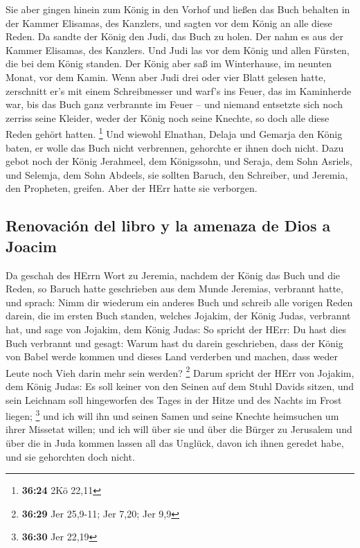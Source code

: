  Sie aber gingen hinein zum König in den Vorhof und
ließen das Buch behalten in der Kammer Elisamas, des Kanzlers, und
sagten vor dem König an alle diese Reden.  Da sandte der
König den Judi, das Buch zu holen. Der nahm es aus der Kammer Elisamas,
des Kanzlers. Und Judi las vor dem König und allen Fürsten, die bei dem
König standen.  Der König aber saß im Winterhause, im
neunten Monat, vor dem Kamin.  Wenn aber Judi drei oder
vier Blatt gelesen hatte, zerschnitt er's mit einem Schreibmesser und
warf's ins Feuer, das im Kaminherde war, bis das Buch ganz verbrannte im
Feuer --  und niemand entsetzte sich noch zerriss seine
Kleider, weder der König noch seine Knechte, so doch alle diese Reden
gehört hatten. \footnote{\textbf{36:24} 2Kö 22,11}  Und
wiewohl Elnathan, Delaja und Gemarja den König baten, er wolle das Buch
nicht verbrennen, gehorchte er ihnen doch nicht.  Dazu
gebot noch der König Jerahmeel, dem Königssohn, und Seraja, dem Sohn
Asriels, und Selemja, dem Sohn Abdeels, sie sollten Baruch, den
Schreiber, und Jeremia, den Propheten, greifen. Aber der HErr hatte sie
verborgen.

\hypertarget{renovaciuxf3n-del-libro-y-la-amenaza-de-dios-a-joacim}{%
\subsection{Renovación del libro y la amenaza de Dios a
Joacim}\label{renovaciuxf3n-del-libro-y-la-amenaza-de-dios-a-joacim}}

 Da geschah des HErrn Wort zu Jeremia, nachdem der König
das Buch und die Reden, so Baruch hatte geschrieben aus dem Munde
Jeremias, verbrannt hatte, und sprach:  Nimm dir wiederum
ein anderes Buch und schreib alle vorigen Reden darein, die im ersten
Buch standen, welches Jojakim, der König Judas, verbrannt hat,
 und sage von Jojakim, dem König Judas: So spricht der
HErr: Du hast dies Buch verbrannt und gesagt: Warum hast du darein
geschrieben, dass der König von Babel werde kommen und dieses Land
verderben und machen, dass weder Leute noch Vieh darin mehr sein werden?
\footnote{\textbf{36:29} Jer 25,9-11; Jer 7,20; Jer 9,9} 
Darum spricht der HErr von Jojakim, dem König Judas: Es soll keiner von
den Seinen auf dem Stuhl Davids sitzen, und sein Leichnam soll
hingeworfen des Tages in der Hitze und des Nachts im Frost liegen;
\footnote{\textbf{36:30} Jer 22,19}  und ich will ihn und
seinen Samen und seine Knechte heimsuchen um ihrer Missetat willen; und
ich will über sie und über die Bürger zu Jerusalem und über die in Juda
kommen lassen all das Unglück, davon ich ihnen geredet habe, und sie
gehorchten doch nicht.

